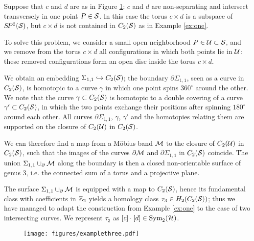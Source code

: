 \begin{ex}
 \label{ex:three}
 Suppose that $c$ and $d$ are as in Figure \ref{fig:examplethree}: $c$ and $d$ are non-separating and 
intersect transversely in one point $P\in\S$. In this case the torus $c\times d$ is a subspace
of $\SP^2(\S)$, but $c\times d$ is not contained in $C_2(\S)$ as in Example \ref{ex:one}.

To solve this problem, we consider a small open neighborhood $P\in \U\subset\S$, and we remove from the torus $c\times d$
all configurations in which both points lie in $\U$: these removed configurations form an open disc inside the torus $c\times d$.

We obtain an embedding $\Sigma_{1,1}\hookrightarrow C_2(\S)$;
the boundary $\partial\Sigma_{1,1}$,
seen as a curve in $C_2(\S)$, is homotopic to a curve $\gamma$ in which one point spins $360^{\circ}$ around the other.
We note that the curve $\gamma\subset C_2(\S)$ is homotopic to a double covering of a curve $\gamma'\subset C_2(\S)$,
in which the two points exchange their positions after spinning $180^{\circ}$ around each other. All curves
$\partial\Sigma_{1,1}$, $\gamma$, $\gamma'$ and the homotopies relating them
are supported on the closure of $C_2(\U)$ in $C_2(\S)$.

We can therefore find a map from a M\"{o}bius band $\M$ to the closure of $C_2(\U)$ in $C_2(\S)$,
such that the images of the curves $\partial\M$ and $\partial\Sigma_{1,1}$ in $C_2(\S)$ coincide.
The union $\Sigma_{1,1}\cup_{\partial}\M$ along the boundary is then a closed
non-orientable surface of genus $3$, i.e. the connected sum of a torus and a projective plane.

The surface $\Sigma_{1,1}\cup_{\partial}\M$ is equipped with a map to $C_2(\S)$, hence its fundamental class with coefficients
in $\Z_2$ yields a homology class $\tau_3\in H_2(C_2(\S))$; thus we have managed to adapt
the construction from Example \ref{ex:one} to the case of two intersecting curves. We represent $\tau_3$
as $[c]\cdot[d]\in\Sym_2(\H)$.
\end{ex}
\begin{figure}[h]\centering
 \texttt{[image: figures/examplethree.pdf]}
 \caption{}
\label{fig:examplethree}
\end{figure}

